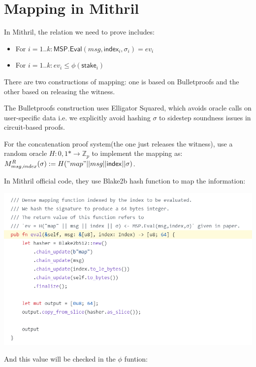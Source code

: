 \documentclass{article}
\begin{document}
\section{Mapping in Mithril}

In Mithril, the relation we need to prove includes:

\begin{itemize}
    \item For $i = 1..k: \mathsf{MSP.Eval}(msg, \mathsf{index}_i, \sigma_i) = ev_i$
    \item For $i = 1..k: ev_i \leq \phi(\mathsf{stake}_i)$
\end{itemize}

There are two constructions of mapping: one is based on Bulletproofs and the other based on releasing the witness. 

The Bulletproofs construction uses Elligator Squared, which avoids oracle calls on user-specific data i.e. we explicitly avoid hashing $\sigma$ to sidestep soundness issues in circuit-based proofs.

For the concatenation proof system(the one just releases the witness), use a random oracle $H : {0, 1}* \rightarrow \mathbb{Z}_p$ to implement the mapping as: $M^R_{msg,index}(\sigma) := H("map"||msg||\mathsf{index}||\sigma)$.

In Mithril official code, they use Blake2b hash function to map the information:

\includegraphics[width=1\linewidth]{mithril-mapping-code.png}

And this value will be checked in the $\phi$ funtion:
\end{document}
